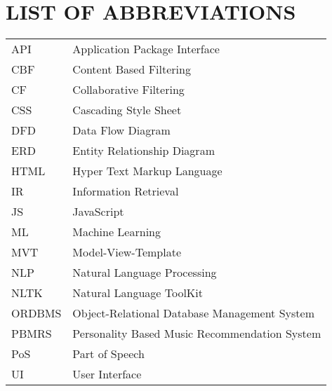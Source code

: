 
\section*{LIST OF ABBREVIATIONS}
\begin{tabular}{l l}
API & Application Package Interface\\
CBF & Content Based Filtering\\
CF & Collaborative Filtering\\
CSS & Cascading Style Sheet\\
DFD & Data Flow Diagram\\
ERD & Entity Relationship Diagram\\
HTML & Hyper Text Markup Language\\
IR & Information Retrieval\\
JS & JavaScript\\
ML & Machine Learning\\
MVT & Model-View-Template\\
NLP & Natural Language Processing\\
NLTK & Natural Language ToolKit\\
ORDBMS & Object-Relational Database Management System\\
PBMRS & Personality Based Music Recommendation System\\
PoS & Part of Speech\\
UI & User Interface\\
\end{tabular}
